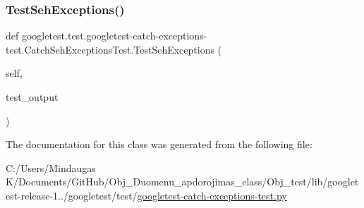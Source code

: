 \mbox{\label{classgoogletest_1_1test_1_1googletest-catch-exceptions-test_1_1_catch_seh_exceptions_test_a1f9a05798bf106a875407ea19e2645c4}} 
\subsubsection{\texorpdfstring{TestSehExceptions()}{TestSehExceptions()}}
{\footnotesize\ttfamily def googletest.\+test.\+googletest-\/catch-\/exceptions-\/test.\+Catch\+Seh\+Exceptions\+Test.\+Test\+Seh\+Exceptions (\begin{DoxyParamCaption}\item[{}]{self,  }\item[{}]{test\+\_\+output }\end{DoxyParamCaption})}



The documentation for this class was generated from the following file\+:\begin{DoxyCompactItemize}
\item 
C\+:/\+Users/\+Mindaugas K/\+Documents/\+Git\+Hub/\+Obj\+\_\+\+Duomenu\+\_\+apdorojimas\+\_\+class/\+Obj\+\_\+test/lib/googletest-\/release-\/1../googletest/test/\mbox{\hyperlink{_obj__test_2lib_2googletest-release-1_88_81_2googletest_2test_2googletest-catch-exceptions-test_8py}{googletest-\/catch-\/exceptions-\/test.\+py}}\end{DoxyCompactItemize}
